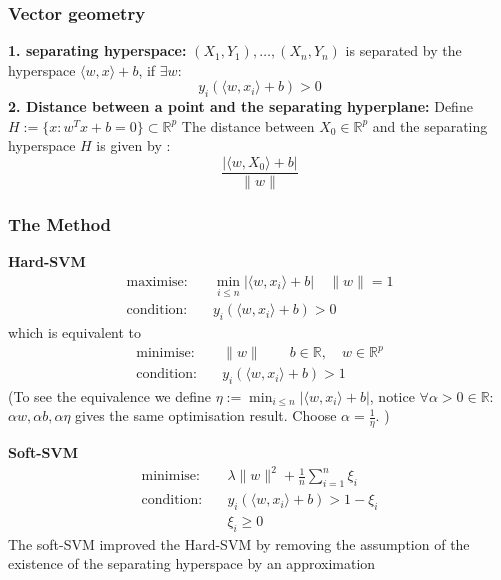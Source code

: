\subsubsection*{Vector geometry}
\textbf{1. separating hyperspace:} $(X_1, Y_1), \dots, (X_n, Y_n)$ is separated by the hyperspace $\langle w, x \rangle + b$, if $\exists w$:
\begin{equation*}
	y_i(\langle w, x_i \rangle + b) > 0
\end{equation*}
\textbf{2. Distance between a point and the separating hyperplane:} Define $H:= \{ x: w^T x + b = 0\} \subset \mathbb{R}^p $ The distance between $X_0 \in \mathbb{R}^p  $ and the separating hyperspace $H$ is given by :
\begin{equation*}
	\frac{| \langle w, X_0 \rangle + b |}{\| w \|} 
\end{equation*}


\subsubsection*{The Method}
\textbf{Hard-SVM}
\begin{equation}
\begin{aligned}
	\text{maximise:}& \quad \min_{i \leq n} | \langle w, x_i \rangle + b| \quad \|w \| = 1 \\
	\text{condition:}& \quad y_i(\langle w, x_i \rangle + b) > 0
\end{aligned}
\end{equation}
which is equivalent to
\begin{equation}
	\begin{aligned}
	\text{minimise:}& \quad \|w\| \qquad b \in \mathbb{R},\quad w \in \mathbb{R}^p \\
	\text{condition:}& \quad y_i(\langle w, x_i \rangle + b) > 1	
	\end{aligned}
\end{equation}
(To see the equivalence we define $\eta := \min_{i \leq n} | \langle w, x_i \rangle + b|$, notice $\forall \alpha > 0 \in \mathbb{R}:$ $\alpha w, \alpha b, \alpha \eta$ gives the same optimisation result. Choose $\alpha = \frac{1}{\eta}$. )

\textbf{Soft-SVM}
\begin{equation}
	\begin{aligned}
	\text{minimise:}& \quad \lambda \|w\|^2 + \frac{1}{n} \sum_{i = 1}^n \xi_i \\
	\text{condition:}& \quad y_i(\langle w, x_i \rangle + b) > 1 - \xi_i\\
					&\quad \xi_i \geq 0	
	\end{aligned}
\end{equation}
The soft-SVM improved the Hard-SVM by removing the assumption of the existence of the separating hyperspace by an approximation

